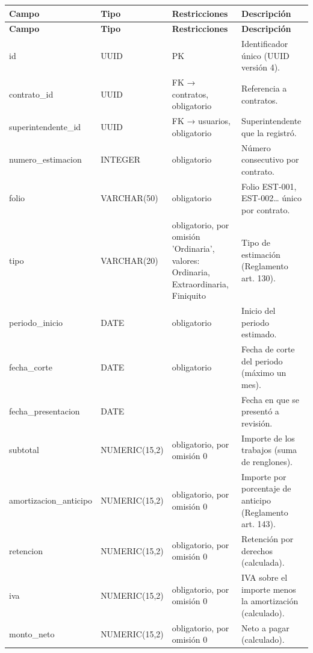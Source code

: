 \begin{xltabular}{\linewidth}{@{}>{\ttfamily\footnotesize}p{4.9cm}>{\ttfamily\footnotesize}p{2.4cm}>{\raggedright\arraybackslash\footnotesize}p{3.3cm}>{\footnotesize}X@{}}
\toprule\normalfont\sffamily\bfseries\footnotesize Campo & \normalfont\sffamily\bfseries\footnotesize Tipo & \sffamily\bfseries Restricciones & \sffamily\bfseries Descripción\\\midrule\endfirsthead
\toprule\normalfont\sffamily\bfseries\footnotesize Campo & \normalfont\sffamily\bfseries\footnotesize Tipo & \sffamily\bfseries Restricciones & \sffamily\bfseries Descripción\\\midrule\endhead
\bottomrule\endfoot
id & UUID & PK & Identificador único (UUID versión 4).\\
contrato\_id & UUID & FK → contratos, obligatorio & Referencia a contratos.\\
superintendente\_id & UUID & FK → usuarios, obligatorio & Superintendente que la registró.\\
numero\_estimacion & INTEGER & obligatorio & Número consecutivo por contrato.\\
folio & VARCHAR(50) & obligatorio & Folio EST-001, EST-002… único por contrato.\\
tipo & VARCHAR(20) & obligatorio, por omisión 'Ordinaria', valores: Ordinaria, Extraordinaria, Finiquito & Tipo de estimación (Reglamento art. 130).\\
periodo\_inicio & DATE & obligatorio & Inicio del periodo estimado.\\
fecha\_corte & DATE & obligatorio & Fecha de corte del periodo (máximo un mes).\\
fecha\_presentacion & DATE &  & Fecha en que se presentó a revisión.\\
subtotal & NUMERIC(15,2) & obligatorio, por omisión 0 & Importe de los trabajos (suma de renglones).\\
amortizacion\_anticipo & NUMERIC(15,2) & obligatorio, por omisión 0 & Importe por porcentaje de anticipo (Reglamento art. 143).\\
retencion & NUMERIC(15,2) & obligatorio, por omisión 0 & Retención por derechos (calculada).\\
iva & NUMERIC(15,2) & obligatorio, por omisión 0 & IVA sobre el importe menos la amortización (calculado).\\
monto\_neto & NUMERIC(15,2) & obligatorio, por omisión 0 & Neto a pagar (calculado).\\

\end{xltabular}
